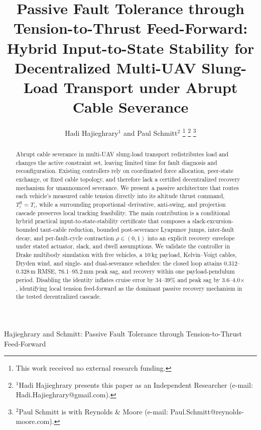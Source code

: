 \documentclass[lettersize,journal]{IEEEtran}
\begin{document}
\title{Passive Fault Tolerance through Tension-to-Thrust Feed-Forward: Hybrid Input-to-State Stability for Decentralized Multi-UAV Slung-Load Transport under Abrupt Cable Severance}
\author{Hadi Hajieghrary$^{1}$ and Paul Schmitt$^{2}$%
\thanks{This work received no external research funding.}%
\thanks{$^{1}$Hadi Hajieghrary presents this paper as an Independent Researcher (e-mail: Hadi.Hajieghrary@gmail.com).}%
\thanks{$^{2}$Paul Schmitt is with Reynolds \& Moore (e-mail: Paul.Schmitt@reynolds-moore.com).}}


%
{Hajieghrary and Schmitt: Passive Fault Tolerance through Tension-to-Thrust Feed-Forward}

\maketitle

\begin{abstract}
Abrupt cable severance in multi-UAV slung-load transport redistributes load and changes the active constraint set, leaving limited time for fault diagnosis and reconfiguration. Existing controllers rely on coordinated force allocation, peer-state exchange, or fixed cable topology, and therefore lack a certified decentralized recovery mechanism for unannounced severance. We present a passive architecture that routes each vehicle's measured cable tension directly into its altitude thrust command, $T_i^{\mathrm{ff}}=T_i$, while a surrounding proportional--derivative, anti-swing, and projection cascade preserves local tracking feasibility. The main contribution is a conditional hybrid practical input-to-state-stability certificate that composes a slack-excursion-bounded taut-cable reduction, bounded post-severance Lyapunov jumps, inter-fault decay, and per-fault-cycle contraction $\rho \in (0,1)$ into an explicit recovery envelope under stated actuator, slack, and dwell assumptions. We validate the controller in Drake multibody simulation with five vehicles, a 10\,kg payload, Kelvin--Voigt cables, Dryden wind, and single- and dual-severance schedules: the closed loop attains 0.312--0.328\,m RMSE, 76.1--95.2\,mm peak sag, and recovery within one payload-pendulum period. Disabling the identity inflates cruise error by 34--39\% and peak sag by 3.6--4.0$\times$, identifying local tension feed-forward as the dominant passive recovery mechanism in the tested decentralized cascade.
\end{abstract}
\end{document}
